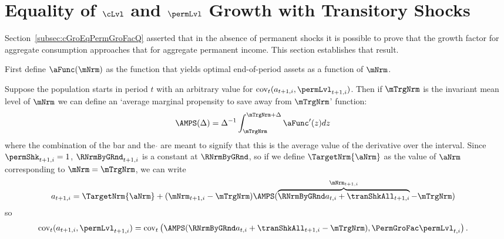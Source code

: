 \documentclass[\econtexRoot/BufferStockTheory]{subfiles}
\begin{document}
\section{Equality of \texorpdfstring{$\cLvl$}{} and \texorpdfstring{$\permLvl$}{p} Growth with Transitory Shocks}\label{sec:ApndxCGroIsPermGroFac}

Section~\ref{subsec:cGroEqPermGroFacQ} asserted that in the absence of permanent shocks it is possible to prove that the growth factor for aggregate consumption approaches that for aggregate permanent income.  This section establishes that result.

First define $\aFunc(\mNrm)$ as the function that yields optimal end-of-period assets as a function of $\mNrm$.

Suppose the population starts in period $t$ with an arbitrary value for
 $\mbox{cov}_{t}(a_{t+1,i},\permLvl_{t+1,i})$. 
 Then if $\mTrgNrm$ is the invariant mean level of $\mNrm$ we can define an `average marginal propensity to save away from $\mTrgNrm$' function:
\begin{equation}\begin{gathered}\begin{aligned}
 \AMPS(\Delta)  & =  \Delta^{-1}\int_{\mTrgNrm}^{\mTrgNrm+\Delta} \aFunc^{\prime}(z)
 dz \label{eq:checkaFunc} \nonumber
\end{aligned}\end{gathered}\end{equation}
where the combination of the bar and the $\acute{}$ are meant to signify that this is the average value of the derivative over the interval.
Since $\permShk_{t+1,i}=1$, $\RNrmByGRnd_{t+1,i}$ is a constant at $\RNrmByGRnd$, so if we define $\TargetNrm{\aNrm}$ as the value of $\aNrm$ corresponding to $\mNrm = \mTrgNrm$, we can write
\begin{equation}\begin{gathered}\begin{aligned}
  a_{t+1,i} 
& =   \TargetNrm{\aNrm}+(\mNrm_{t+1,i}-\mTrgNrm)\AMPS(\overbrace{\RNrmByGRnd
    a_{t,i}+\tranShkAll_{t+1,i}}^{\mNrm_{t+1,i}}-\mTrgNrm) \nonumber
\end{aligned}\end{gathered}\end{equation}
so
\begin{equation}\begin{gathered}\begin{aligned}
\mbox{cov}_{t}(a_{t+1,i},\permLvl_{t+1,i})
 & = \mbox{cov}_{t}\left(\AMPS(\RNrmByGRnd  a_{t,i}+\tranShkAll_{t+1,i}-\mTrgNrm)
  ,\PermGroFac   \permLvl_{t,i}\right). \nonumber
\end{aligned}\end{gathered}\end{equation}
\end{document}
